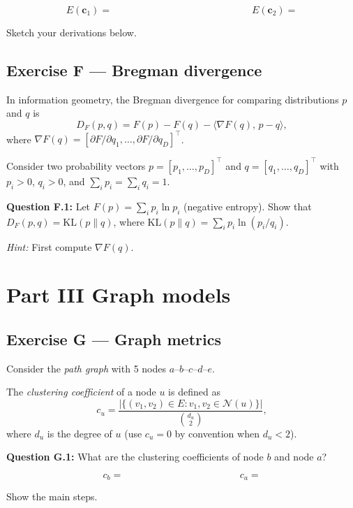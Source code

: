 \documentclass[12pt,a4paper]{article}
\newcommand{\KL}{\mathrm{KL}}
\begin{document}
\[
  E(\mathbf{c}_1) = \hspace{6cm} E(\mathbf{c}_2) =
\]

Sketch your derivations below.

\vspace{5cm}

\newpage
\subsection*{Exercise F --- Bregman divergence}

In information geometry, the Bregman divergence for comparing distributions $p$ and $q$ is
\[
  D_F(p, q) = F(p) - F(q) - \langle \nabla F(q),\, p - q\rangle, \tag{8}
\]
where $\nabla F(q) = [\partial F/\partial q_1, \ldots, \partial F/\partial q_D]^\top$.

Consider two probability vectors $p=[p_1,\ldots,p_D]^\top$ and $q=[q_1,\ldots,q_D]^\top$ with
$p_i>0$, $q_i>0$, and $\sum_i p_i=\sum_i q_i=1$.

\textbf{Question F.1:} Let $F(p)=\sum_i p_i\ln p_i$ (negative entropy).
Show that $D_F(p,q)=\KL(p\|q)$, where $\KL(p\|q)=\sum_i p_i\ln(p_i/q_i)$.

\emph{Hint:} First compute $\nabla F(q)$.

\vspace{8cm}

\newpage
\section*{Part III \quad Graph models}

\subsection*{Exercise G --- Graph metrics}

Consider the \emph{path graph} with 5 nodes $a$--$b$--$c$--$d$--$e$.

The \emph{clustering coefficient} of a node $u$ is defined as
\[
  c_u = \frac{|\{(v_1,v_2)\in E : v_1,v_2\in\mathcal{N}(u)\}|}{\binom{d_u}{2}}, \tag{9}
\]
where $d_u$ is the degree of $u$ (use $c_u=0$ by convention when $d_u<2$).

\textbf{Question G.1:} What are the clustering coefficients of node $b$ and node $a$?

\[
  c_b = \hspace{5cm} c_a =
\]

Show the main steps.

\vspace{3cm}
\end{document}
